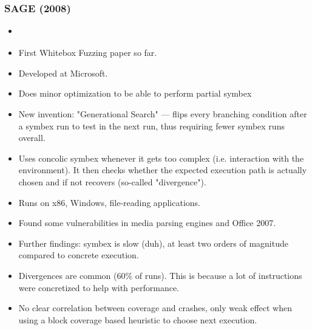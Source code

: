 \documentclass[12pt]{article}
\begin{document}
\subsubsection{SAGE (2008)}
\begin{itemize}
    \item \cite{SAGE}
    \item First Whitebox Fuzzing paper so far.
    \item Developed at Microsoft.
    \item Does minor optimization to be able to perform partial symbex
    \item New invention: "Generational Search" — flips every branching condition after a symbex run to test in the next run, thus requiring fewer symbex runs overall.
    \item Uses concolic symbex whenever it gets too complex (i.e. interaction with the environment). It then checks whether the expected execution path is actually chosen and if not recovers (so-called "divergence").
    \item Runs on x86, Windows, file-reading applications.
    \item Found some vulnerabilities in media parsing engines and Office 2007.
    \item Further findings: symbex is slow (duh), at least two orders of magnitude compared to concrete execution.
    \item Divergences are common (60\% of runs). This is because a lot of instructions were concretized to help with performance.
    \item No clear correlation between coverage and crashes, only weak effect when using a block coverage based heuristic to choose next execution.
\end{itemize}



\end{document}
